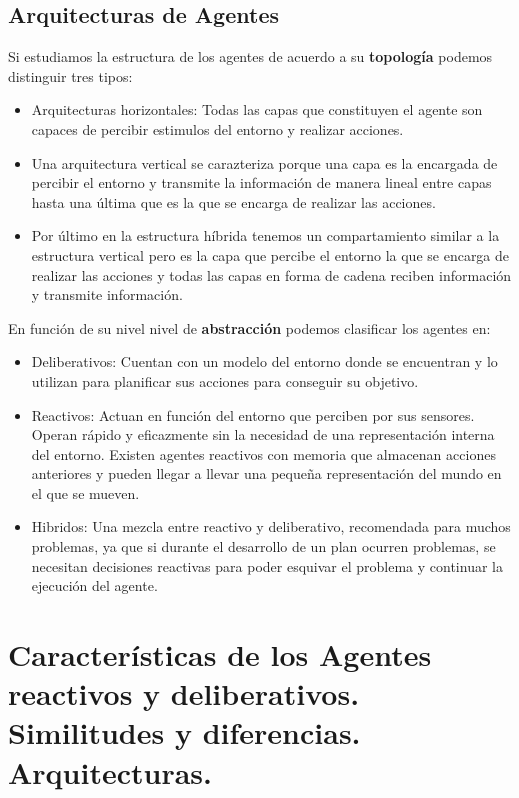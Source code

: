 \documentclass[12pt]{article}
\begin{document}
\subsection{Arquitecturas de Agentes}

Si estudiamos la estructura de los agentes de acuerdo a su \textbf{topología}
podemos distinguir tres tipos:

\begin{itemize}
\item Arquitecturas horizontales: Todas las capas que constituyen el
  agente son capaces de percibir estimulos del entorno y realizar
  acciones.
\item Una arquitectura vertical se carazteriza porque una capa es la
  encargada de percibir el entorno y transmite la información de
  manera lineal entre capas hasta una última que es la que se encarga
  de realizar las acciones.
\item Por último en la estructura híbrida tenemos un compartamiento
  similar a la estructura vertical pero es la capa que percibe el
  entorno la que se encarga de realizar las acciones y todas las capas
  en forma de cadena reciben información y transmite información.
\end{itemize}

En función de su nivel nivel de \textbf{abstracción} podemos
clasificar los agentes en:

\begin{itemize}
\item Deliberativos: Cuentan con un modelo del entorno donde se
  encuentran y lo utilizan para planificar sus acciones para conseguir
  su objetivo.
\item Reactivos: Actuan en función del entorno que perciben por sus
  sensores. Operan rápido y eficazmente sin la necesidad de una
  representación interna del entorno. Existen agentes reactivos con
  memoria que almacenan acciones anteriores y pueden llegar a llevar
  una pequeña representación del mundo en el que se mueven.
\item Hibridos: Una mezcla entre reactivo y deliberativo, recomendada
  para muchos problemas, ya que si durante el desarrollo de un plan
  ocurren problemas, se necesitan decisiones reactivas para poder
  esquivar el problema y continuar la ejecución del agente.
\end{itemize}


\section{Características de los Agentes reactivos y deliberativos. Similitudes y diferencias. Arquitecturas.}
\end{document}
